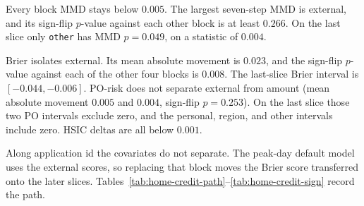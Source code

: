 \documentclass[11pt]{article}
\begin{document}
Every block MMD stays below \(0.005\). The largest seven-step MMD is
external, and its sign-flip \(p\)-value against each other block is at
least \(0.266\). On the last slice only \texttt{other} has MMD \(p=0.049\),
on a statistic of \(0.004\).

Brier isolates external. Its mean absolute movement is \(0.023\), and the
sign-flip \(p\)-value against each of the other four blocks is \(0.008\).
The last-slice Brier interval is \([-0.044,-0.006]\). PO-risk does not
separate external from amount (mean absolute movement \(0.005\) and
\(0.004\), sign-flip \(p=0.253\)). On the last slice those two PO intervals
exclude zero, and the personal, region, and other intervals include zero.
HSIC deltas are all below \(0.001\).

Along application id the covariates do not separate. The peak-day default
model uses the external scores, so replacing that block moves the Brier
score transferred onto the later slices.
Tables~\ref{tab:home-credit-path}--\ref{tab:home-credit-sign} record the path.


\end{document}
